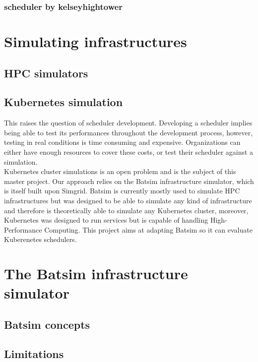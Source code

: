 \documentclass[12pt]{report}
\begin{document}
\subsubsection{scheduler by kelseyhightower}


\section{Simulating infrastructures}
\subsection{HPC simulators}
\subsection{Kubernetes simulation}

This raises the question of scheduler development. Developing a scheduler
implies being able to test its performances throughout the development process,
however, testing in real conditions is time consuming and expensive.
Organizations can either have enough resources to cover these costs, or test
their scheduler against a simulation.\\

Kubernetes cluster simulations is an open problem and is the subject of this
master project. Our approach relies on the Batsim\cite{batsim} infrastructure
simulator, which is itself built upon Simgrid\cite{simgrid}. Batsim is
currently mostly used to simulate HPC infrastructures but was designed to be
able to simulate any kind of infrastructure and therefore is theoretically able
to simulate any Kubernetes cluster, moreover, Kubernetes was designed to run
services but is capable of handling High-Performance
Computing\cite{kube-for-hpc}. This project aims at adapting Batsim so it can
evaluate Kuberenetes schedulers.

\section{The Batsim infrastructure simulator}
\subsection{Batsim concepts}

\subsection{Limitations}
\end{document}
